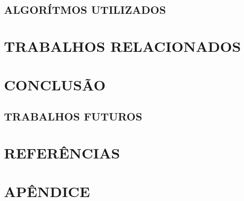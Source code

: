 \documentclass[12pt,a4paper]{article}
\begin{document}
				\lipsum[1]

		\subsection{ALGORÍTMOS UTILIZADOS}

			\lipsum[1]

	\newpage

	\section{TRABALHOS RELACIONADOS}

		\lipsum[1]

	\newpage


	\section{CONCLUSÃO}

	\lipsum[1]

		\subsection{TRABALHOS FUTUROS}

			\lipsum[1]

	\newpage


	\section*{REFERÊNCIAS}

	\lipsum[1]

	\newpage

	\section*{APÊNDICE}

	\lipsum[1]

	\newpage
\end{document}
